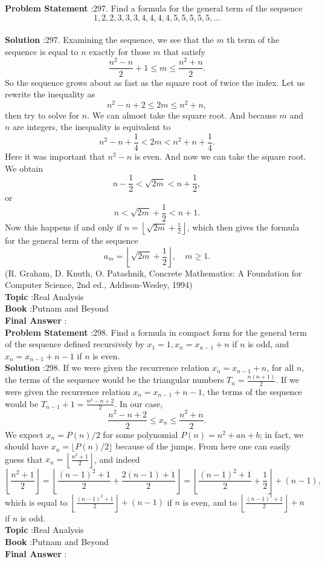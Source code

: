 \documentclass[10pt]{article}
\begin{document}
\textbf{Problem Statement} :297. Find a formula for the general term of the sequence$$ 1,2,2,3,3,3,4,4,4,4,5,5,5,5,5, \ldots $$\\
\textbf{Solution} :297. Examining the sequence, we see that the $m$ th term of the sequence is equal to $n$ exactly for those $m$ that satisfy$$ \frac{n^{2}-n}{2}+1 \leq m \leq \frac{n^{2}+n}{2} . $$So the sequence grows about as fast as the square root of twice the index. Let us rewrite the inequality as$$ n^{2}-n+2 \leq 2 m \leq n^{2}+n, $$then try to solve for $n$. We can almost take the square root. And because $m$ and $n$ are integers, the inequality is equivalent to$$ n^{2}-n+\frac{1}{4}<2 m<n^{2}+n+\frac{1}{4} . $$Here it was important that $n^{2}-n$ is even. And now we can take the square root. We obtain$$ n-\frac{1}{2}<\sqrt{2 m}<n+\frac{1}{2}, $$or$$ n<\sqrt{2 m}+\frac{1}{2}<n+1 . $$Now this happens if and only if $n=\left\lfloor\sqrt{2 m}+\frac{1}{2}\right\rfloor$, which then gives the formula for the general term of the sequence$$ a_{m}=\left\lfloor\sqrt{2 m}+\frac{1}{2}\right\rfloor, \quad m \geq 1 . $$(R. Graham, D. Knuth, O. Patashnik, Concrete Mathematics: A Foundation for Computer Science, 2nd ed., Addison-Wesley, 1994) \\
\textbf{Topic} :Real Analysis\\
\textbf{Book} :Putnam and Beyond\\
\textbf{Final Answer} :\\


\textbf{Problem Statement} :298. Find a formula in compact form for the general term of the sequence defined recursively by $x_{1}=1, x_{n}=x_{n-1}+n$ if $n$ is odd, and $x_{n}=x_{n-1}+n-1$ if $n$ is even.\\
\textbf{Solution} :298. If we were given the recurrence relation $x_{n}=x_{n-1}+n$, for all $n$, the terms of the sequence would be the triangular numbers $T_{n}=\frac{n(n+1)}{2}$. If we were given the recurrence relation $x_{n}=x_{n-1}+n-1$, the terms of the sequence would be $T_{n-1}+1=\frac{n^{2}-n+2}{2}$. In our case,$$ \frac{n^{2}-n+2}{2} \leq x_{n} \leq \frac{n^{2}+n}{2} . $$We expect $x_{n}=P(n) / 2$ for some polynomial $P(n)=n^{2}+a n+b$; in fact, we should have $x_{n}=\lfloor P(n) / 2\rfloor$ because of the jumps. From here one can easily guess that $x_{n}=\left\lfloor\frac{n^{2}+1}{2}\right\rfloor$, and indeed$$ \left\lfloor\frac{n^{2}+1}{2}\right\rfloor=\left\lfloor\frac{(n-1)^{2}+1}{2}+\frac{2(n-1)+1}{2}\right\rfloor=\left\lfloor\frac{(n-1)^{2}+1}{2}+\frac{1}{2}\right\rfloor+(n-1), $$which is equal to $\left\lfloor\frac{(n-1)^{2}+1}{2}\right\rfloor+(n-1)$ if $n$ is even, and to $\left\lfloor\frac{(n-1)^{2}+1}{2}\right\rfloor+n$ if $n$ is odd. \\
\textbf{Topic} :Real Analysis\\
\textbf{Book} :Putnam and Beyond\\
\textbf{Final Answer} :\\
\end{document}
